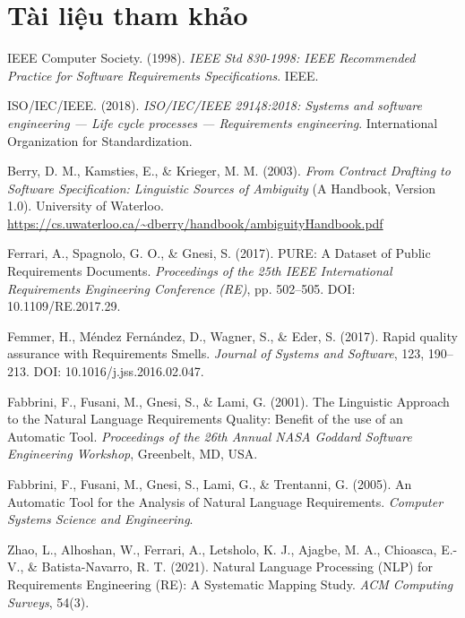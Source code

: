 \documentclass[12pt,a4paper]{report}
\begin{document}
\chapter*{Tài liệu tham khảo}

\begin{enumerate}[leftmargin=2.2em,label={[\arabic*]}]
  IEEE Computer Society. (1998). \textit{IEEE Std 830-1998: IEEE Recommended Practice for Software Requirements Specifications}. IEEE.

  ISO/IEC/IEEE. (2018). \textit{ISO/IEC/IEEE 29148:2018: Systems and software engineering --- Life cycle processes --- Requirements engineering}. International Organization for Standardization.

  Berry, D. M., Kamsties, E., \& Krieger, M. M. (2003). \textit{From Contract Drafting to Software Specification: Linguistic Sources of Ambiguity} (A Handbook, Version 1.0). University of Waterloo. \url{https://cs.uwaterloo.ca/~dberry/handbook/ambiguityHandbook.pdf}

  Ferrari, A., Spagnolo, G. O., \& Gnesi, S. (2017). PURE: A Dataset of Public Requirements Documents. \textit{Proceedings of the 25th IEEE International Requirements Engineering Conference (RE)}, pp. 502--505. DOI: 10.1109/RE.2017.29.

  Femmer, H., Méndez Fernández, D., Wagner, S., \& Eder, S. (2017). Rapid quality assurance with Requirements Smells. \textit{Journal of Systems and Software}, 123, 190--213. DOI: 10.1016/j.jss.2016.02.047.

  Fabbrini, F., Fusani, M., Gnesi, S., \& Lami, G. (2001). The Linguistic Approach to the Natural Language Requirements Quality: Benefit of the use of an Automatic Tool. \textit{Proceedings of the 26th Annual NASA Goddard Software Engineering Workshop}, Greenbelt, MD, USA.

  Fabbrini, F., Fusani, M., Gnesi, S., Lami, G., \& Trentanni, G. (2005). An Automatic Tool for the Analysis of Natural Language Requirements. \textit{Computer Systems Science and Engineering}.

  Zhao, L., Alhoshan, W., Ferrari, A., Letsholo, K. J., Ajagbe, M. A., Chioasca, E.-V., \& Batista-Navarro, R. T. (2021). Natural Language Processing (NLP) for Requirements Engineering (RE): A Systematic Mapping Study. \textit{ACM Computing Surveys}, 54(3).


\end{enumerate}
\end{document}
